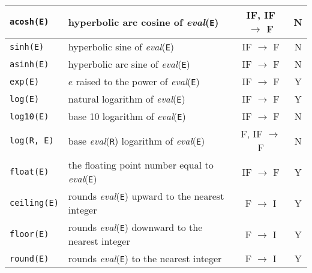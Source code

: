 \begin{supertabular}{|l|L{7.5cm}|c|c|}
\hline

\texttt{acosh(E)} & hyperbolic arc cosine of \textit{eval}(\texttt{E}) & IF, IF $\rightarrow$ F & N \\

\hline

\texttt{sinh(E)} & hyperbolic sine of \textit{eval}(\texttt{E}) & IF $\rightarrow$ F & N \\

\hline

\texttt{asinh(E)} & hyperbolic arc sine of \textit{eval}(\texttt{E}) & IF $\rightarrow$ F & N \\

\hline

\texttt{exp(E)} & $e$ raised to the power of \textit{eval}(\texttt{E}) &
IF $\rightarrow$ F & Y \\

\hline

\texttt{log(E)} & natural logarithm of \textit{eval}(\texttt{E}) & IF
$\rightarrow$ F & Y \\

\hline

\texttt{log10(E)} & base 10 logarithm of \textit{eval}(\texttt{E}) & IF
$\rightarrow$ F & N \\

\hline

\texttt{log(R, E)} & base \textit{eval}(\texttt{R}) logarithm of \textit{eval}(\texttt{E})  & F, IF
$\rightarrow$ F & N \\

\hline

\texttt{float(E)} & the floating point number equal to
\textit{eval}(\texttt{E}) & IF $\rightarrow$ F & Y \\

\hline

\texttt{ceiling(E)} & rounds \textit{eval}(\texttt{E}) upward to the
nearest integer & F $\rightarrow$ I & Y \\

\hline

\texttt{floor(E)} & rounds \textit{eval}(\texttt{E}) downward to the
nearest integer & F $\rightarrow$ I & Y \\

\hline

\texttt{round(E)} & rounds \textit{eval}(\texttt{E}) to the nearest integer
& F $\rightarrow$ I & Y \\

\hline


\end{supertabular}
